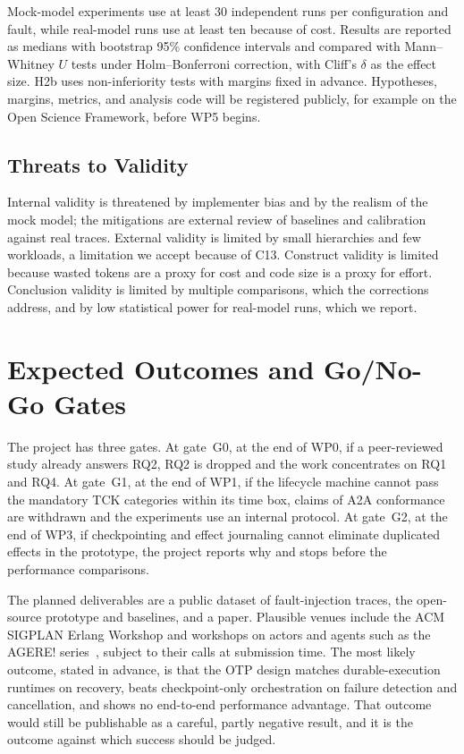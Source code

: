 \documentclass[conference,letterpaper]{IEEEtran}
\begin{document}
Mock-model experiments use at least 30 independent runs per configuration
and fault, while real-model runs use at least ten because of cost. Results
are reported as medians with bootstrap 95\% confidence intervals and
compared with Mann--Whitney $U$ tests under Holm--Bonferroni correction,
with Cliff's $\delta$ as the effect size. H2b uses non-inferiority tests
with margins fixed in advance. Hypotheses, margins, metrics, and analysis
code will be registered publicly, for example on the Open Science
Framework, before WP5 begins.

\subsection{Threats to Validity}

Internal validity is threatened by implementer bias and by the realism of
the mock model; the mitigations are external review of baselines and
calibration against real traces. External validity is limited by small
hierarchies and few workloads, a limitation we accept because of C13.
Construct validity is limited because wasted tokens are a proxy for cost and
code size is a proxy for effort. Conclusion validity is limited by multiple
comparisons, which the corrections address, and by low statistical power
for real-model runs, which we report.

\section{Expected Outcomes and Go/No-Go Gates}\label{sec:gates}

The project has three gates. At gate~G0, at the end of WP0, if a
peer-reviewed study already answers RQ2, RQ2 is dropped and the work
concentrates on RQ1 and RQ4. At gate~G1, at the end of WP1, if the lifecycle
machine cannot pass the mandatory TCK categories within its time box, claims
of A2A conformance are withdrawn and the experiments use an internal
protocol. At gate~G2, at the end of WP3, if checkpointing and effect
journaling cannot eliminate duplicated effects in the prototype, the project
reports why and stops before the performance comparisons.

The planned deliverables are a public dataset of fault-injection traces, the
open-source prototype and baselines, and a paper. Plausible venues include
the ACM SIGPLAN Erlang Workshop and workshops on actors and agents such as
the AGERE! series~\cite{agere}, subject to their calls at submission time.
The most likely outcome, stated in advance, is that the OTP design matches
durable-execution runtimes on recovery, beats checkpoint-only orchestration
on failure detection and cancellation, and shows no end-to-end performance
advantage. That outcome would still be publishable as a careful,
partly negative result, and it is the outcome against which success should
be judged.
\end{document}
